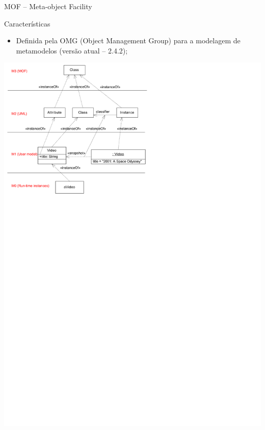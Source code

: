 \documentclass[12pt,t]{beamer}
\begin{document}
	 \begin{frame}{MOF -- Meta-object Facility}
	 	\begin{block}{Características}
	 		\begin{itemize}
	 			\item Definida pela OMG (Object Management Group) para a modelagem de metamodelos (versão atual -- 2.4.2);
	 		\end{itemize}
	 	\end{block}	 
	 	\begin{block}{ }
 	 		\centerline{\includegraphics[trim=0 430 260 5, clip=true, totalheight=0.80\textheight]{mof.pdf}}
	 	\end{block}
     \end{frame}
\end{document}
